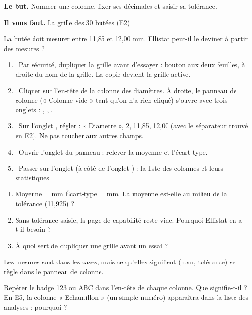 \documentclass[10pt,a4paper]{article}
\begin{document}
\thispagestyle{fancy}
\begin{tcolorbox}[boite]\textbf{Le but.} Nommer une colonne, fixer ses décimales et saisir sa tolérance.\par\textbf{Il vous faut.} La grille des 30 butées (E2)\end{tcolorbox}
\begin{tcolorbox}[pred]La butée doit mesurer entre 11,85 et 12,00 mm. Ellistat peut-il le deviner à partir des mesures ?\reponse\end{tcolorbox}
\begin{enumerate}[label=\textcolor{cyan}{\textbf{\arabic*.}},leftmargin=15pt,itemsep=1.5pt]
\item \tagE\ Par sécurité, dupliquer la grille avant d'essayer : bouton aux deux feuilles, à droite du nom de la grille. La copie devient la grille active.
\item \tagE\ Cliquer sur l'en-tête de la colonne des diamètres. À droite, le panneau de colonne (« Colonne vide » tant qu'on n'a rien cliqué) s'ouvre avec trois onglets : , , .
\item \tagE\ Sur l'onglet , régler :  « Diametre »,  2,  11,85,  12,00 (avec le séparateur trouvé en E2). Ne pas toucher aux autres champs.
\item \tagE\ Ouvrir l'onglet  du panneau : relever la moyenne et l'écart-type.
\item \tagE\ Passer sur l'onglet  (à côté de l'onglet ) : la liste des colonnes et leurs statistiques.
\end{enumerate}
\begin{enumerate}[label=\textcolor{cyan}{\textbf{Q\arabic*.}},leftmargin=22pt]
\item Moyenne = \champ{20mm} mm \quad Écart-type = \champ{20mm} mm. La moyenne est-elle au milieu de la tolérance (11,925) ?\reponse[1]
\item Sans tolérance saisie, la page de capabilité reste vide. Pourquoi Ellistat en a-t-il besoin ?\reponse[2]
\item À quoi sert de dupliquer une grille avant un essai ?\reponse[1]
\end{enumerate}
\begin{tcolorbox}[retenir]Les mesures sont dans les cases, mais ce qu'elles signifient (nom, tolérance) se règle dans le panneau de colonne.\end{tcolorbox}
\begin{tcolorbox}[plus]Repérer le badge 123 ou ABC dans l'en-tête de chaque colonne. Que signifie-t-il ? En E5, la colonne « Echantillon » (un simple numéro) apparaîtra dans la liste des analyses : pourquoi ?\end{tcolorbox}
\end{document}
